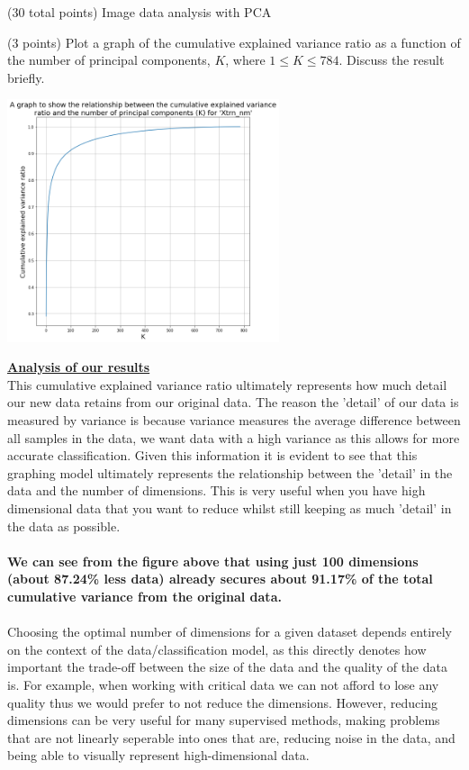 \documentclass[12pt]{article}
\begin{document}
\begin{question}{(30 total points) Image data analysis with PCA}
\begin{subquestion}{(3 points)
       Plot a graph of the cumulative explained variance ratio as a function of the number of principal components, $K$, where $1\le K \le 784$.
       Discuss the result briefly.
     }
      \begin{answerbox}{30em}
        \begin{center}
         \includegraphics[width=0.6\textwidth]{images/q14.png}
        \end{center}
        \scriptsize{
        \textbf{\footnotesize{\underline{Analysis of our results}}}\\
        This cumulative explained variance ratio ultimately represents how much detail our new data retains from our original data. The reason the 'detail' of our data is measured by variance is because variance measures the average difference between all samples in the data, we want data with a high variance as this allows for more accurate classification. Given this information it is evident to see that this graphing model ultimately represents the relationship between the 'detail' in the data and the number of dimensions. This is very useful when you have high dimensional data that you want to reduce whilst still keeping as much 'detail' in the data as possible.\\
\\
        \textbf{We can see from the figure above that using just 100 dimensions (about 87.24\% less data) already secures about 91.17\% of the total cumulative variance from the original data.}\\
\\
        Choosing the optimal number of dimensions for a given dataset depends entirely on the context of the data/classification model, as this directly denotes how important the trade-off between the size of the data and the quality of the data is. For example, when working with critical data we can not afford to lose any quality thus we would prefer to not reduce the dimensions. However, reducing dimensions can be very useful for many supervised methods, making problems that are not linearly seperable into ones that are, reducing noise in the data, and being able to visually represent high-dimensional data.
        }
      \end{answerbox}
  



\end{subquestion}
\end{question}
\end{document}
